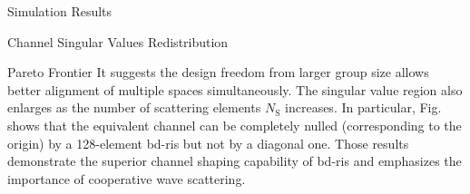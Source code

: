 \documentclass[journal]{IEEEtran}
\begin{document}
\begin{section}{Simulation Results}
\begin{subsection}{Channel Singular Values Redistribution}
\begin{subsubsection}{Pareto Frontier}
			It suggests the design freedom from larger group size allows better alignment of multiple spaces simultaneously.
			The singular value region also enlarges as the number of scattering elements $N_\mathrm{S}$ increases.
			In particular, Fig.  shows that the equivalent channel can be completely nulled (corresponding to the origin) by a 128-element \gls{bd}-\gls{ris} but not by a diagonal one.
			Those results demonstrate the superior channel shaping capability of \gls{bd}-\gls{ris} and emphasizes the importance of cooperative wave scattering.
		\end{subsubsection}


\end{subsection}
\end{section}
\end{document}
